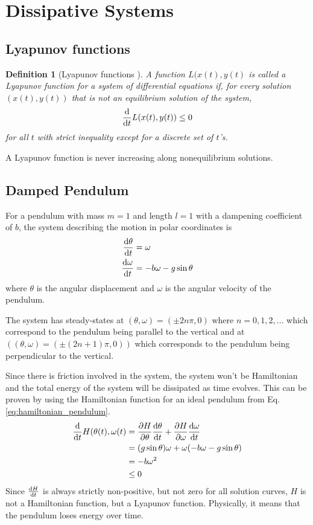\documentclass[12pt,1in]{article}
\newtheorem{definition}{Definition}
\begin{document}
\section{Dissipative Systems}
\subsection{Lyapunov functions}
\begin{definition}[Lyapunov functions \cite{diff_eq}]	
A function $L(x(t), y(t)$ is called a \emph{Lyapunov function} for a system of differential equations if, for every solution $(x(t), y(t))$ that is not an equilibrium solution of the system,
\begin{align}
\derivative{}{t} L(x(t), y(t))  \leq 0
\end{align}
for all $t$ with strict inequality except for a discrete set of $t$'s. 
\end{definition}
A Lyapunov function is never increasing along nonequilibrium solutions.

\subsection{Damped Pendulum}
For a pendulum with mass $m = 1$ and length $l = 1$ with a dampening coefficient of $b$, the system describing the motion in polar coordinates is
\begin{align}
\derivative{\theta}{t} &= \omega \\
\derivative{\omega}{t} &= - b \omega - g \sin\theta
\end{align}
where $\theta$ is the angular displacement and $\omega$ is the angular velocity of the pendulum.

The system has steady-states at $(\theta, \omega) = (\pm 2n\pi,0)$ where $n = 0, 1, 2, \ldots$ which correspond to the pendulum being parallel to the vertical and at $((\theta, \omega) = (\pm (2n + 1)\pi,0))$ which corresponds to the pendulum being perpendicular to the vertical. 

Since there is friction involved in the system, the system won't be Hamiltonian and the total energy of the system will be dissipated as time evolves. This can be proven by using the Hamiltonian function for an ideal pendulum from Eq. \ref{eq:hamiltonian_pendulum}. 
\begin{align}
\derivative{}{t}H(\theta(t), \omega(t) &= \frac{\partial H}{\partial \theta} \derivative{\theta}{t} + \frac{\partial H}{\partial \omega} \derivative{\omega}{t} \\
&= (g \sin\theta ) \omega + \omega (- b \omega - g \sin\theta) \nonumber \\
&= - b \omega^2 \\ 
&\leq 0 \nonumber
\end{align}
Since $\derivative{H}{t}$ is always strictly non-positive, but not zero for all solution curves, $H$ is not a Hamiltonian function, but a Lyapunov function. Physically, it means that the pendulum loses energy over time.  
\end{document}
